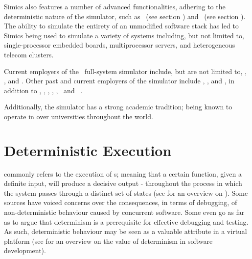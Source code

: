 Simics also features a number of advanced functionalities, adhering to the deterministic nature of the simulator, such as \dvttermcheckpointing\ (see section ) and \dvttermreverseexecution\ (see section ).\\

\noindent
The ability to simulate the entirety of an unmodified software stack has led to Simics being used to simulate a variety of systems including, but not limited to, single-processor embedded boards, multiprocessor servers, and heterogeneous telecom clusters.

Current employers of the \dvttermsimics\ full-system simulator include, but are not limited to, \dvttermibm {}, \dvttermnasa {}, and \dvttermintel {}.
Other past and current employers of the simulator include \dvttermsunmicrosystems , \dvttermericsson , and \dvttermhewlettpackard {}, in addition to \dvttermcisco , \dvttermfreescalesemiconductor , \dvttermgeavionics , \dvttermhoneywell , \dvttermlockheedmartin , \dvttermnortel\ and \dvttermnorthropgrumman\ .

Additionally, the simulator has a strong academic tradition; being known to operate in over  universities throughout the world.


\section{Deterministic Execution}
\label{sec:background_deterministicexecution}

 commonly refers to the execution of \dvttermdeterministicalgorithm s; meaning that a certain function, given a definite input, will produce a decisive output - throughout the process in which the system passes through a distinct set of states (see  for an overview on ).
Some sources have voiced concerns over the consequences, in terms of debugging, of non-deterministic behaviour caused by concurrent software.
Some even go as far as to argue that determinism is a prerequisite for effective debugging and testing.
As such, deterministic behaviour may be seen as a valuable attribute in a virtual platform (see  for an overview on the value of determinism in software development).

